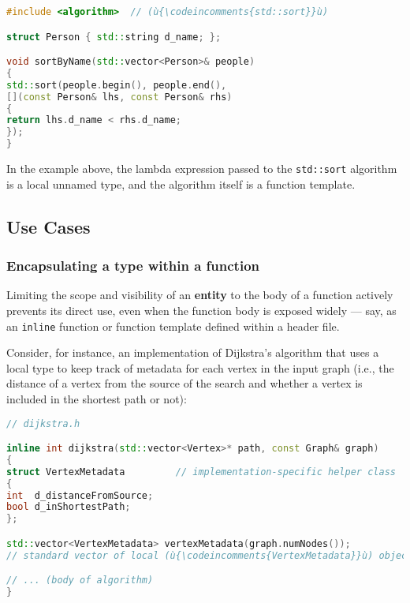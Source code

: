 \begin{lstlisting}[language=C++]
#include <algorithm>  // (ù{\codeincomments{std::sort}}ù)

struct Person { std::string d_name; };

void sortByName(std::vector<Person>& people)
{
std::sort(people.begin(), people.end(),
[](const Person& lhs, const Person& rhs)
{
return lhs.d_name < rhs.d_name;
});
}
\end{lstlisting}

\noindent In the example above, the lambda expression passed to the
\texttt{std::sort} algorithm is a local unnamed type, and the algorithm
itself is a function template.

\subsection[Use Cases]{Use Cases}\label{use-cases}

\subsubsection[Encapsulating a type within a function]{Encapsulating a type within a function}\label{encapsulating-a-type-within-a-function}

Limiting the scope and visibility of an \textbf{entity} to the body of a
function actively prevents its direct use, even when the function body
is exposed widely --- say, as an \texttt{inline} function or function
template defined within a header file.

Consider, for instance, an implementation of Dijkstra's algorithm that
uses a local type to keep track of metadata for each vertex in the input
graph (i.e., the distance of a vertex from the source of the search and
whether a vertex is included in the shortest path or not):

\begin{lstlisting}[language=C++]
// dijkstra.h

inline int dijkstra(std::vector<Vertex>* path, const Graph& graph)
{
struct VertexMetadata         // implementation-specific helper class
{
int  d_distanceFromSource;
bool d_inShortestPath;
};

std::vector<VertexMetadata> vertexMetadata(graph.numNodes());
// standard vector of local (ù{\codeincomments{VertexMetadata}}ù) objects -- one per vertex

// ... (body of algorithm)
}
\end{lstlisting}

